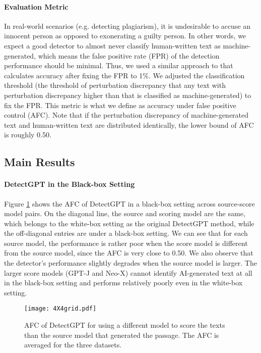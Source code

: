 \documentclass[11pt]{article}
\begin{document}
\paragraph{Evaluation Metric} In real-world scenarios (e.g. detecting plagiarism), it is undesirable to accuse an innocent person as opposed to exonerating a guilty person. In other words, we expect a good detector to almost never classify human-written text as machine-generated, which means the false positive rate (FPR) of the detection performance should be minimal. Thus, we used a similar approach to \citet{paraphrase} that calculates accuracy after fixing the FPR to 1\%. We adjusted the classification threshold (the threshold of perturbation discrepancy that any text with perturbation discrepancy higher than that is classified as machine-generated) to fix the FPR. This metric is what we define as accuracy under false positive control (AFC). Note that if the perturbation discrepancy of machine-generated text and human-written text are distributed identically, the lower bound of AFC is roughly 0.50.

\subsection{Main Results}

\paragraph{DetectGPT in the Black-box Setting} Figure \ref{fig: Heatmap} shows the AFC of DetectGPT in a black-box setting across source-score model pairs. On the diagonal line, the source and scoring model are the same, which belongs to the white-box setting as the original DetectGPT method, while the off-diagonal entries are under a black-box setting. We can see that for each source model, the performance is rather poor when the score model is different from the source model, since the AFC is very close to 0.50. We also observe that the detector's performance slightly degrades when the source model is larger. The larger score models (GPT-J and Neo-X) cannot identify AI-generated text at all in the black-box setting and performs relatively poorly even in the white-box setting.

\begin{figure}[h]
    \centering
    \texttt{[image: 4X4grid.pdf]}
    \vspace{-3mm}
    \caption{AFC of DetectGPT for using a different model to score the texts than the source model that generated the passage. The AFC is averaged for the three datasets.}
    \vspace{-5mm}
    \label{fig: Heatmap}
\end{figure}
\end{document}

